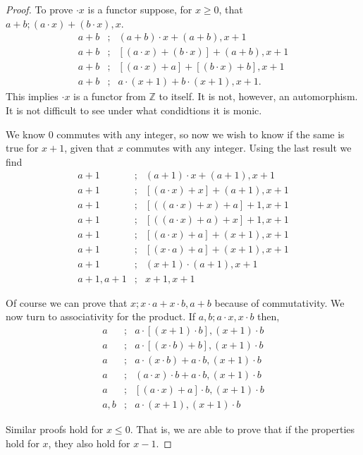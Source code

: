 \documentclass [12pt]{book}
\begin{document}
\begin{proof}To prove $\cdot x$ is a functor suppose, for $x\geq0$, that $a+b;(a\cdot x)+(b\cdot x),x$.\begin{eqnarray}\nonumber a+b&;&(a+b)\cdot x+(a+b),x+1\\\nonumber a+b&;&[(a\cdot x)+(b\cdot x)]+(a+b),x+1\\\nonumber a+b&;&[(a\cdot x)+a]+[(b\cdot x)+b],x+1\\\nonumber a+b&;&a\cdot(x+1)+b\cdot(x+1),x+1.\end{eqnarray}This implies $\cdot x$ is a functor from $\mathbb Z$ to itself. It is not, however, an automorphism. It is not difficult to see under what condidtions it is monic.

We know 0 commutes with any integer, so now we wish to know if the same is true for $x+1$, given that $x$ commutes with any integer. Using the last result we find
\begin{eqnarray}\nonumber a+1&;&(a+1)\cdot x+(a+1),x+1\\\nonumber a+1&;&[(a\cdot x)+x]+(a+1),x+1\\\nonumber a+1&;&[((a\cdot x)+x)+a]+1,x+1\\\nonumber a+1&;&[((a\cdot x)+a)+x]+1,x+1\\\nonumber a+1&;&[(a\cdot x)+a]+(x+1),x+1\\\nonumber a+1&;&[(x\cdot a)+a]+(x+1),x+1\\\nonumber a+1&;&(x+1)\cdot(a+1),x+1\\\nonumber a+1,a+1&;&x+1,x+1\end{eqnarray}

Of course we can prove that $x;x\cdot a+x\cdot b,a+b$ because of commutativity. We now turn to associativity for the product. If $a,b;a\cdot x,x\cdot b$ then,
\begin{eqnarray}\nonumber a&;&a\cdot[(x+1)\cdot b],(x+1)\cdot b\\\nonumber a&;&a\cdot[(x\cdot b)+b],(x+1)\cdot b\\\nonumber a&;&a\cdot(x\cdot b)+a\cdot b,(x+1)\cdot b\\\nonumber a&;&(a\cdot x)\cdot b+a\cdot b,(x+1)\cdot b\\\nonumber a&;&[(a\cdot x)+a]\cdot b,(x+1)\cdot b\\\nonumber a,b&;&a\cdot (x+1),(x+1)\cdot b\end{eqnarray}

Similar proofs hold for $x\leq0$. That is, we are able to prove that if the properties hold for $x$, they also hold for $x-1$.\end{proof}
\end{document}

